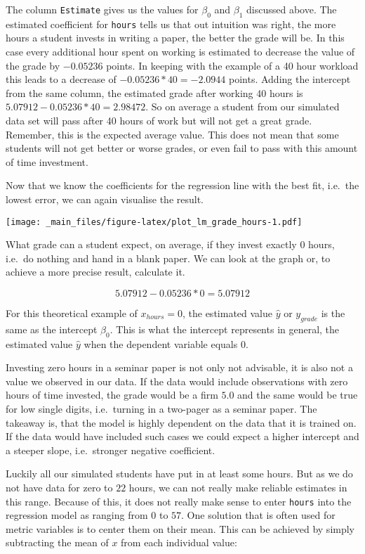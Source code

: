 \documentclass[
]{book}
\begin{document}
The column \texttt{Estimate} gives us the values for \(\beta_0\) and \(\beta_1\) discussed
above. The estimated coefficient for \texttt{hours} tells us that out intuition was
right, the more hours a student invests in writing a paper, the better the grade
will be. In this case every additional hour spent on working is estimated to decrease the
value of the grade by \(-0.05236\) points. In keeping with the example of a 40
hour workload this leads to a decrease of \(-0.05236 * 40 = -2.0944\) points.
Adding the intercept from the same column, the estimated grade after working 40
hours is \(5.07912 -0.05236 * 40 = 2.98472\). So on average a student from our
simulated data set will pass after 40 hours of work but will not get a great
grade.
Remember, this is the expected average value. This does not mean that some
students will not get better or worse grades, or even fail to pass with this
amount of time investment.

Now that we know the coefficients for the regression line with the best fit,
i.e.~the lowest error, we can again visualise the result.

\texttt{[image: \_main\_files/figure-latex/plot\_lm\_grade\_hours-1.pdf]}

What grade can a student expect, on average, if they invest exactly 0
hours, i.e.~do nothing and hand in a blank paper. We can look at the graph or,
to achieve a more precise result, calculate it.

\[5.07912 -0.05236 * 0 = 5.07912\]

For this theoretical example of \(x_{hours} = 0\), the estimated value \(\hat{y}\)
or \(y_{grade}\) is the same as the intercept \(\beta_0\). This is what the
intercept represents in general, the estimated value \(\hat{y}\) when the
dependent variable equals \(0\).

Investing zero hours in a seminar paper is not only not advisable, it is
also not a value we observed in our data. If the data would include observations
with zero hours of time invested, the grade would be a firm \(5.0\) and the same
would be true for low single digits, i.e.~turning in a two-pager as a seminar
paper. The takeaway is, that the model is highly dependent on the data that it
is trained on. If the data would have included such cases we could expect a
higher intercept and a steeper slope, i.e.~stronger negative coefficient.

Luckily all our simulated students have put in at least some hours. But as we do
not have data for zero to \(22\) hours, we can not really make reliable estimates
in this range. Because of this, it does not really make sense to enter \texttt{hours}
into the regression model as ranging from \(0\) to \(57\). One solution that is
often used for metric variables is to center them on their mean. This can be
achieved by simply subtracting the mean of \(x\) from each individual value:
\end{document}
